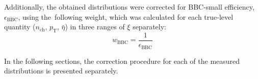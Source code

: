 Additionally, the obtained distributions were corrected for BBC-small efficiency, $\epsilon_\textrm{BBC}$, using the~following weight, which was calculated for each true-level quantity ($n_\textrm{ch}$, $p_\textrm{T}$, $\bar{\eta}$) in three ranges of $\xi$ separately:
\begin{equation}
w_\textrm{BBC} = \frac{1}{\epsilon_\textrm{BBC}}
\label{eq:bbcCorrection}
\end{equation} 

In the following sections, the correction procedure   for each of the measured distributions is presented separately.







